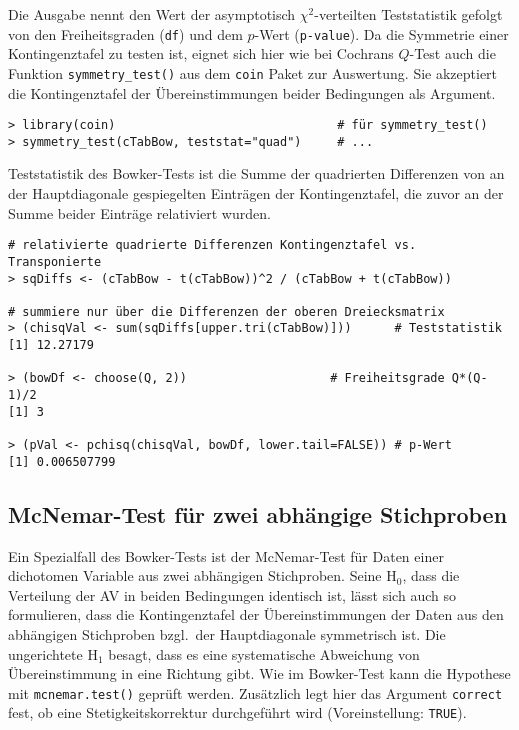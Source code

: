 Die Ausgabe nennt den Wert der asymptotisch $\chi^{2}$-verteilten Teststatistik gefolgt von den Freiheitsgraden (\lstinline!df!) und dem $p$-Wert (\lstinline!p-value!). Da die Symmetrie einer Kontingenztafel zu testen ist, eignet sich hier wie bei Cochrans $Q$-Test auch die Funktion \lstinline!symmetry_test()! aus dem \lstinline!coin! Paket zur Auswertung. Sie akzeptiert die Kontingenztafel der Übereinstimmungen beider Bedingungen als Argument.
\begin{lstlisting}
> library(coin)                               # für symmetry_test()
> symmetry_test(cTabBow, teststat="quad")     # ...
\end{lstlisting}

Teststatistik des Bowker-Tests ist die Summe der quadrierten Differenzen von an der Hauptdiagonale gespiegelten Einträgen der Kontingenztafel, die zuvor an der Summe beider Einträge relativiert wurden.
\begin{lstlisting}
# relativierte quadrierte Differenzen Kontingenztafel vs. Transponierte
> sqDiffs <- (cTabBow - t(cTabBow))^2 / (cTabBow + t(cTabBow))

# summiere nur über die Differenzen der oberen Dreiecksmatrix
> (chisqVal <- sum(sqDiffs[upper.tri(cTabBow)]))      # Teststatistik
[1] 12.27179

> (bowDf <- choose(Q, 2))                    # Freiheitsgrade Q*(Q-1)/2
[1] 3

> (pVal <- pchisq(chisqVal, bowDf, lower.tail=FALSE)) # p-Wert
[1] 0.006507799
\end{lstlisting}

\subsection{McNemar-Test für zwei abhängige Stichproben}
\label{sec:mcNemar}

Ein Spezialfall des Bowker-Tests ist der McNemar-Test für Daten einer dichotomen Variable aus zwei abhängigen Stichproben. Seine $\text{H}_{0}$, dass die Verteilung der AV in beiden Bedingungen identisch ist, lässt sich auch so formulieren, dass die Kontingenztafel der Übereinstimmungen der Daten aus den abhängigen Stichproben bzgl.\ der Hauptdiagonale symmetrisch ist. Die ungerichtete $\text{H}_{1}$ besagt, dass es eine systematische Abweichung von Übereinstimmung in eine Richtung gibt. Wie im Bowker-Test kann die Hypothese mit  \lstinline!mcnemar.test()! geprüft werden. Zusätzlich legt hier das Argument \lstinline!correct! fest, ob eine Stetigkeitskorrektur durchgeführt wird (Voreinstellung: \lstinline!TRUE!).

